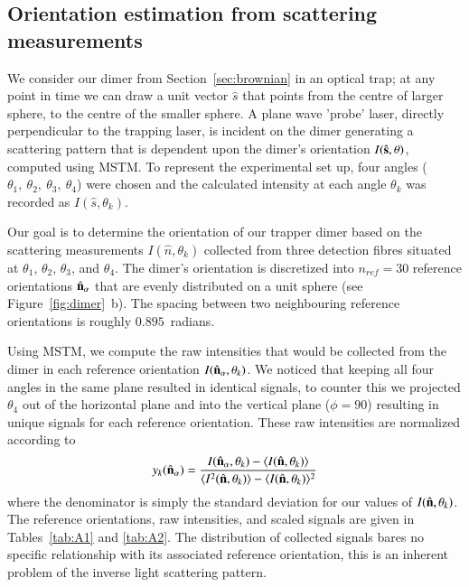\documentclass[final,  3p]{elsarticle}
\begin{document}
\subsection{Orientation estimation from scattering measurements}
\label{sec:Bayes}

We consider our dimer from Section~\ref{sec:brownian} in an optical trap; at any point in time we can draw a unit vector $\hat{s}$ that points from the centre of larger sphere, to the centre of the smaller sphere. A plane wave 'probe' laser, directly perpendicular to the trapping laser, is incident on the dimer generating a scattering pattern that is dependent upon the dimer's orientation $I(\hat{\bf s}, \theta)$, computed using MSTM. To represent the experimental set up, four angles  ($\theta_1, \ \theta_2, \ \theta_3, \ \theta_4$) were chosen and the calculated intensity at each angle $\theta_k$ was recorded as $I(\hat{s}, \theta_k)$. 

Our goal is to determine the orientation of our trapper dimer based on
the scattering measurements $I(\hat{n}, \theta_k)$ collected from
three detection fibres situated at $\theta_1$, $\theta_2$, $\theta_3$,
and $\theta_4$.  The dimer's orientation is discretized into
$n_{ref}=30$ reference orientations $\hat{\bf n}_{\alpha}$ that are
evenly distributed on a unit sphere \cite{Rey2006} (see
Figure~\ref{fig:dimer}~b).  The spacing between two neighbouring
reference orientations is roughly $0.895$~radians.

Using MSTM, we compute the raw intensities that would be collected
from the dimer in each reference orientation
$I(\hat{\bf n}_{\alpha}, \theta_k)$. We noticed that keeping all four
angles in the same plane resulted in identical signals, to counter
this we projected $\theta_4$ out of the horizontal plane and into the
vertical plane ($\phi = 90$) resulting in unique signals for each
reference orientation.
%
These raw intensities are normalized according to
\begin{align}
\label{eq:scale}
  y_k(\hat{\bf n}_\alpha)
  = 
  \frac{I(\hat{\bf n}_\alpha, \theta_k) - \langle I(\hat{\bf n},\theta_k) \rangle } 
  {\langle I^2(\hat{\bf n},\theta_k) \rangle -\langle I(\hat{\bf n}, \theta_k)\rangle^2}
\end{align}
where the denominator is simply the standard deviation for our values
of $I(\hat{\bf n}, \theta_k)$.  The reference orientations, raw
intensities, and scaled signals are given in Tables~\ref{tab:A1} and
\ref{tab:A2}.  The distribution of collected signals bares no specific
relationship with its associated reference orientation, this is an
inherent problem of the inverse light scattering pattern.
\end{document}
